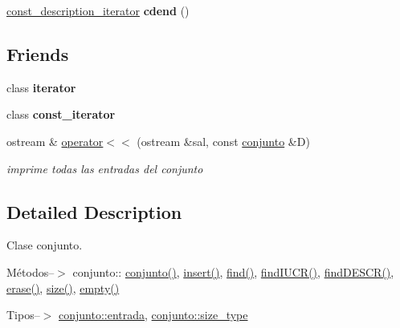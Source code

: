 \begin{DoxyCompactItemize}
\item 
\hypertarget{classconjunto_aa8c9ce5a7a4534fc5169b66807dc023b}{\hyperlink{classconjunto_1_1const__description__iterator}{const\-\_\-description\-\_\-iterator} {\bfseries cdend} ()}\label{classconjunto_aa8c9ce5a7a4534fc5169b66807dc023b}

\end{DoxyCompactItemize}
\subsection*{Friends}
\begin{DoxyCompactItemize}
\item 
\hypertarget{classconjunto_a67171474c4da6cc8efe0c7fafefd2b2d}{class {\bfseries iterator}}\label{classconjunto_a67171474c4da6cc8efe0c7fafefd2b2d}

\item 
\hypertarget{classconjunto_ac220ce1c155db1ac44146c12d178056f}{class {\bfseries const\-\_\-iterator}}\label{classconjunto_ac220ce1c155db1ac44146c12d178056f}

\item 
ostream \& \hyperlink{classconjunto_ae54b721035471d372f29c0335c42734a}{operator$<$$<$} (ostream \&sal, const \hyperlink{classconjunto}{conjunto} \&D)
\begin{DoxyCompactList}\small\item\em imprime todas las entradas del conjunto \end{DoxyCompactList}\end{DoxyCompactItemize}


\subsection{Detailed Description}
Clase conjunto. 

Métodos--$>$ conjunto\-:\-: \hyperlink{classconjunto_a16d987f42c679efab01748178ba45891}{conjunto()}, \hyperlink{classconjunto_aa65b9f7c4cb9bad6d4e40c1973095930}{insert()}, \hyperlink{classconjunto_a64d02e56b460a58d596f986c055f0a2e}{find()}, \hyperlink{classconjunto_a2ca2a7b59bce8369e9d9ccc1c7be9614}{find\-I\-U\-C\-R()}, \hyperlink{classconjunto_afff3e7f4b3d00f422dd7ab2fec935378}{find\-D\-E\-S\-C\-R()}, \hyperlink{classconjunto_ad550177fa4454da3a10fa356417e39a7}{erase()}, \hyperlink{classconjunto_a533c699fbbbdcb8b9f8362f3b27cd9d7}{size()}, \hyperlink{classconjunto_afcf4ff3ff3c1f83b63e901efebe93533}{empty()}

Tipos--$>$ \hyperlink{classconjunto_a09cad766dd65de73e51eae21f9d22585}{conjunto\-::entrada}, \hyperlink{classconjunto_a855a5893bb0f5a851ab2dbf2b8aa6cc7}{conjunto\-::size\-\_\-type}

